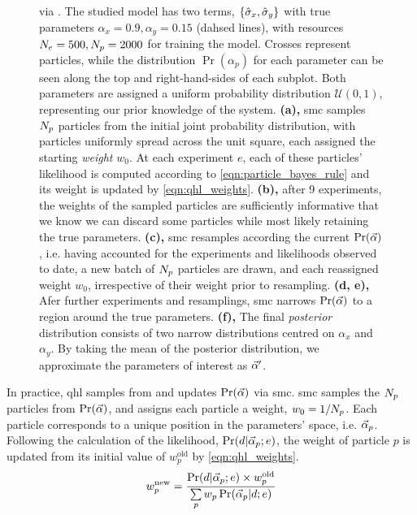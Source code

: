 \begin{figure}
{    }
    \caption[ via ]{
         via . 
        The studied model has two terms, $\{\hat{\sigma}_{x}, \hat{\sigma}_{y}\}$ with true parameters $\alpha_{x}=0.9, \alpha_y=0.15$ (dahsed lines), 
            with resources $N_e=500, N_p=2000$ for training the model. 
        Crosses represent particles, while the distribution $\Pr(\alpha_p)$ for each 
            parameter can be seen along the top and right-hand-sides of each subplot. 
        Both parameters are assigned a uniform probability distribution $\mathcal{U}(0,1)$, representing our prior knowledge of the system. 
        \textbf{(a),} \gls{smc} samples $N_p$ particles from the initial joint probability distribution, 
            with particles uniformly spread across the unit square, each assigned the starting \emph{weight} $w_0$. 
            At each experiment $e$, each of these particles' \gls{likelihood} is computed according to \cref{eqn:particle_bayes_rule}
            and its weight is updated by \cref{eqn:qhl_weights}.
        \textbf{(b),} after 9 experiments, the weights of the sampled particles are sufficiently informative that we know we can 
            discard some particles while most likely retaining the true parameters. 
        \textbf{(c),} \gls{smc} resamples according the current $\Pr(\vec{\alpha})$, 
            i.e. having accounted for the experiments and \glspl{likelihood}  observed to date, 
            a new batch of $N_p$ particles are drawn, and each reassigned weight $w_0$, 
            irrespective of their weight prior to resampling.  
        \textbf{(d, e),} Afer further experiments and resamplings, \gls{smc} narrows $\Pr(\vec{\alpha})$ to a region around the true parameters. 
        \textbf{(f),} The final \emph{posterior} distribution consists of two narrow distributions centred on $\alpha_x$ and $\alpha_y$. 
        By taking the mean of the posterior distribution, we approximate the parameters of interest as $\vec{\alpha}^{\prime}$. 
    }
    \label{fig:qhl_smc}
\end{figure}
In practice, \gls{qhl} samples from and updates $\Pr(\vec{\alpha})$  via \gls{smc}.
\gls{smc} samples the $N_p$ particles from $\Pr(\vec{\alpha})$, and assigns each particle a weight, $w_0 = 1/N_p$.
Each particle corresponds to a unique position in the parameters' space, i.e. $\vec{\alpha}_p$.
Following the calculation of the likelihood, $\Pr(d | \vec{\alpha}_p; e)$, 
    the weight of particle $p$ is updated from its initial value of $w_p^{\textrm{old}}$ by \cref{eqn:qhl_weights}.
\begin{equation}\label{eqn:qhl_weights}
    w_p^{\textrm{new}} = \frac{\Pr(d | \vec{\alpha}_p; e) \times w_p^{\textrm{old}} } { \sum\limits_{p} w_p \Pr(\vec{\alpha}_p | d; e) }
\end{equation}

